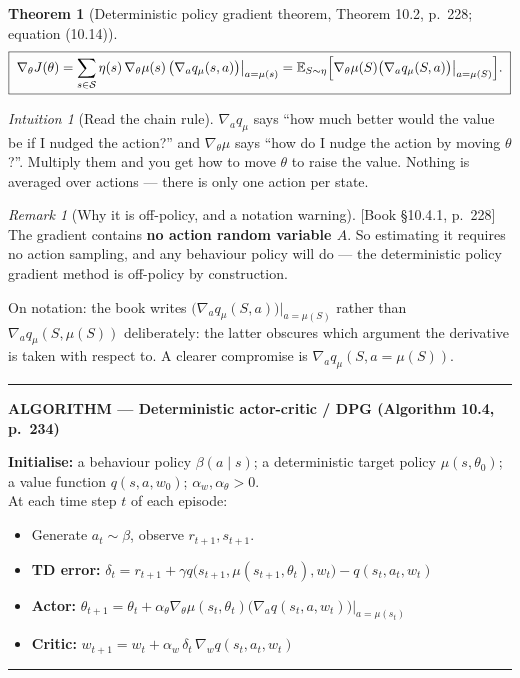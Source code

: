 \documentclass[11pt, letterpaper]{article}
\theoremstyle{runin}
\theoremstyle{runinplain}
\newtheorem{theorem}{Theorem}[section]
\theoremstyle{remark}
\newtheorem*{remark}{Remark}
\newtheorem*{intuition}{Intuition}
\newcommand{\E}{\mathbb{E}}
\newcommand{\Sspace}{\mathcal{S}}
\newcommand{\bkin}[1]{{\color{bookblue}\small[\textsf{Book #1}]}}
\newenvironment{algobox}[1]
  {\par\medskip\noindent\rule{\textwidth}{0.9pt}\par\nobreak\vspace{0.25em}
   \noindent\textbf{\small ALGORITHM --- #1}\par\nobreak\vspace{0.15em}
   \small}
  {\par\nobreak\vspace{0.25em}\noindent\rule{\textwidth}{0.9pt}\par\medskip}
\begin{document}
\begin{theorem}[Deterministic policy gradient theorem, Theorem 10.2, p.~228; equation (10.14)]
\[
  \boxed{\;
  \nabla_\theta J(\theta)=\sum_{s\in\Sspace}\eta(s)\,\nabla_\theta\mu(s)\,
    \bigl(\nabla_a q_\mu(s,a)\bigr)\big|_{a=\mu(s)}
  =\E_{S\sim\eta}\Bigl[\nabla_\theta\mu(S)\bigl(\nabla_aq_\mu(S,a)\bigr)\big|_{a=\mu(S)}\Bigr].\;}
\]
\end{theorem}

\begin{intuition}[Read the chain rule]
$\nabla_aq_\mu$ says ``how much better would the value be if I nudged the action?''
and $\nabla_\theta\mu$ says ``how do I nudge the action by moving $\theta$?''.
Multiply them and you get how to move $\theta$ to raise the value. Nothing is
averaged over actions --- there is only one action per state.
\end{intuition}

\begin{remark}[Why it is off-policy, and a notation warning]
\bkin{\S10.4.1, p.~228}
The gradient contains \textbf{no action random variable $A$}. So estimating it
requires no action sampling, and any behaviour policy will do --- the deterministic
policy gradient method is off-policy by construction.

On notation: the book writes $\bigl(\nabla_aq_\mu(S,a)\bigr)|_{a=\mu(S)}$ rather
than $\nabla_aq_\mu(S,\mu(S))$ deliberately: the latter obscures which argument the
derivative is taken with respect to. A clearer compromise is
$\nabla_aq_\mu(S,a{=}\mu(S))$.
\end{remark}

\begin{algobox}{Deterministic actor-critic / DPG (Algorithm 10.4, p.~234)}
\textbf{Initialise:} a behaviour policy $\beta(a\mid s)$; a deterministic target
policy $\mu(s,\theta_0)$; a value function $q(s,a,w_0)$; $\alpha_w,\alpha_\theta>0$.\\
At each time step $t$ of each episode:
\begin{itemize}\itemsep0pt
  \item Generate $a_t\sim\beta$, observe $r_{t+1},s_{t+1}$.
  \item \textbf{TD error:}
        $\delta_t=r_{t+1}+\gamma q\bigl(s_{t+1},\mu(s_{t+1},\theta_t),w_t\bigr)-q(s_t,a_t,w_t)$
  \item \textbf{Actor:}
        $\theta_{t+1}=\theta_t+\alpha_\theta\nabla_\theta\mu(s_t,\theta_t)\bigl(\nabla_aq(s_t,a,w_t)\bigr)\big|_{a=\mu(s_t)}$
  \item \textbf{Critic:}
        $w_{t+1}=w_t+\alpha_w\,\delta_t\,\nabla_wq(s_t,a_t,w_t)$
\end{itemize}
\end{algobox}
\end{document}
